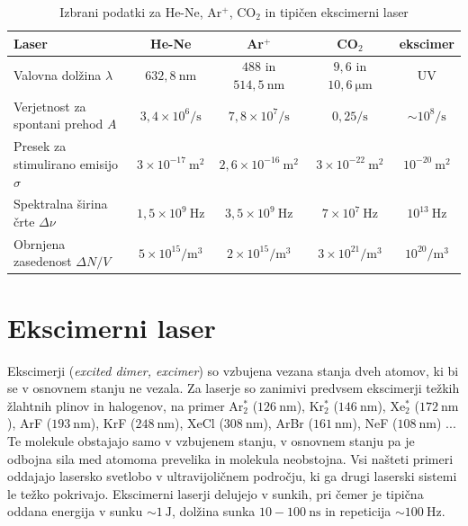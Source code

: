 \begin{table}
\small
\begin{center}
\begin{tabular}{|l|c|c|c|c|}\hline
Laser & He-Ne & Ar$^+$ & CO$_2$ & ekscimer\\ \hline
Valovna dolžina  $\lambda$ & $632,8~\si{\nano\metre}$& $488$ in
$514,5~\si{\nano\metre}$ & $9,6$ in $10,6~\si{\micro\metre}$ & UV
\\ \hline
Verjetnost za spontani prehod $A$ & $3,4 \times 10^6/\si{\second}$ & 
$7,8 \times 10^7/\si{\second}$ & $0,25/\si{\second}$ & $\sim 10^8/\si{\second}$ \\ \hline
Presek za stimulirano emisijo $\sigma$ & $3 \times 10^{-17}~\si{\metre}^2$&  $2,6 \times 10^{-16}~\si{\metre}^2$ & $3 \times 10^{-22}~\si{\metre}^2$ & $ 10^{-20}~\si{\metre}^2$ \\ \hline
Spektralna širina črte $\Delta \nu$ & $1,5 \times 10^{9}~\si{\hertz}$ & 
$3,5 \times 10^{9}~\si{\hertz}$ &$7 \times 10^{7}~\si{\hertz}$ & $10^{13}~\si{\hertz}$ \\ \hline
Obrnjena zasedenost $\Delta N/V$ & $5 \times 10^{15}/\si{\metre}^3$ & $2 \times 10^{15}/\si{\metre}^3$ & $3 \times 10^{21}/\si{\metre}^3$ & $10^{20}/\si{\metre}^3$\\ \hline
\end{tabular}
\caption{Izbrani podatki za He-Ne, Ar$^+$, CO$_2$ in tipičen ekscimerni laser}
\label{tab:Ar}
\end{center}
\end{table}

\section{Ekscimerni laser}
Ekscimerji ({\it excited dimer, excimer}) so vzbujena vezana stanja dveh atomov, 
ki bi se v osnovnem stanju ne vezala. Za laserje so zanimivi predvsem ekscimerji
težkih žlahtnih plinov in halogenov, na primer Ar$_2^*$ ($126~\si{\nano\metre}$), 
Kr$_2^*$ ($146~\si{\nano\metre}$), Xe$_2^*$ ($172~\si{\nano\metre}$),
ArF ($193~\si{\nano\metre}$), KrF ($248~\si{\nano\metre}$), 
XeCl ($308~\si{\nano\metre}$), ArBr ($161~\si{\nano\metre}$), 
NeF ($108~\si{\nano\metre}$) ... Te molekule obstajajo samo v vzbujenem stanju,
v osnovnem stanju pa je odbojna sila med atomoma prevelika in molekula neobstojna.
Vsi našteti primeri oddajajo lasersko svetlobo v
ultravijoličnem področju, ki ga drugi laserski sistemi le težko pokrivajo. 
Ekscimerni laserji delujejo v sunkih, pri čemer je tipična oddana energija v sunku 
$\sim 1~\si{\joule}$, dolžina sunka $10-100~\si{\nano\second}$ in repeticija 
$\sim 100~\si{\hertz}$.

